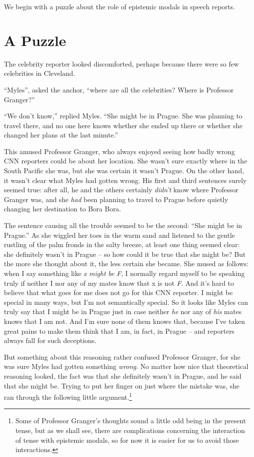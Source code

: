 \documentclass[
  11pt,
  letterpaper,
  DIV=11,
  numbers=noendperiod,
  twoside]{scrartcl}
\begin{document}
We begin with a puzzle about the role of epistemic modals in speech
reports.

\section{A Puzzle}\label{a-puzzle}

The celebrity reporter looked discomforted, perhaps because there were
so few celebrities in Cleveland.

``Myles'', asked the anchor, ``where are all the celebrities? Where is
Professor Granger?''

``We don't know,'' replied Myles. ``She might be in Prague. She was
planning to travel there, and no one here knows whether she ended up
there or whether she changed her plans at the last minute.''

This amused Professor Granger, who always enjoyed seeing how badly wrong
CNN reporters could be about her location. She wasn't sure exactly where
in the South Pacific she was, but she was certain it wasn't Prague. On
the other hand, it wasn't clear what Myles had gotten wrong. His first
and third sentences surely seemed true: after all, he and the others
certainly \emph{didn't} know where Professor Granger was, and she
\emph{had} been planning to travel to Prague before quietly changing her
destination to Bora Bora.

The sentence causing all the trouble seemed to be the second: ``She
might be in Prague.'' As she wiggled her toes in the warm sand and
listened to the gentle rustling of the palm fronds in the salty breeze,
at least one thing seemed clear: she definitely wasn't in Prague -- so
how could it be true that she might be? But the more she thought about
it, the less certain she became. She mused as follows: when I say
something like \emph{x might be F}, I normally regard myself to be
speaking truly if neither I nor any of my mates know that x is not
\emph{F}. And it's hard to believe that what goes for me does not go for
this CNN reporter. I might be special in many ways, but I'm not
semantically special. So it looks like Myles can truly say that I might
be in Prague just in case neither \emph{he} nor any of \emph{his} mates
knows that I am not. And I'm sure none of them knows that, because I've
taken great pains to make them think that I am, in fact, in Prague --
and reporters always fall for such deceptions.

But something about this reasoning rather confused Professor Granger,
for she was sure Myles had gotten something \emph{wrong}. No matter how
nice that theoretical reasoning looked, the fact was that she definitely
wasn't in Prague, and he said that she might be. Trying to put her
finger on just where the mistake was, she ran through the following
little argument.\footnote{Some of Professor Granger's thoughts sound a
  little odd being in the present tense, but as we shall see, there are
  complications concerning the interaction of tense with epistemic
  modals, so for now it is easier for us to avoid those interactions.}
\end{document}
